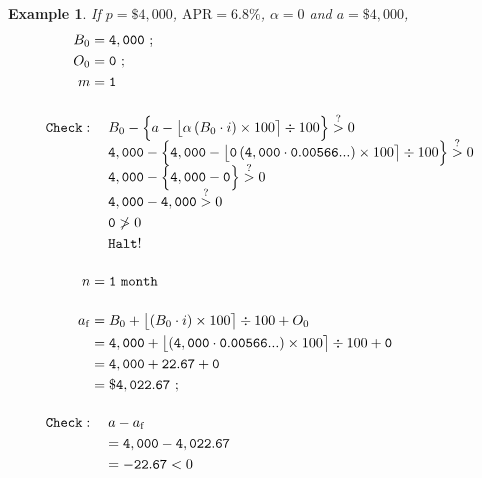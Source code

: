 \documentclass[12pt,letterpaper,oneside]{article}
\newtheorem{example}{Example}[section]
\theoremstyle{remark} %
\begin{document}
	\renewcommand{\rate}{0.00566...}
	\renewcommand{\proportion}{0}
	\renewcommand{\amount}{4,000}
	\renewcommand{\balance}{4,000}
	\renewcommand{\interest}{0}
	\renewcommand{\months}{0}
	\renewcommand{\monthsp}{1}
	\renewcommand{\balanceitf}{\balance}
	\renewcommand{\interestitf}{\interest}
	\renewcommand{\monthsitf}{\months}%
	\renewcommand{\monthspitf}{\monthsp}%
	\renewcommand{\amountfinal}{4,022.67}
	\begin{example}
	If $p=\$4,000$, $\mbox{APR}=6.8\%$, $\alpha=0$ and $a=\$4,000$,
	\footnotesize
	\begin{align*}
	B_{0}&=\mathtt{\balance}\ ;\\
	O_{0}&=\mathtt{\interest}\ ;\\
	m&=\mathtt{\monthsp}\\[12pt]
	\mathtt{Check:}&\quad\;B_{\months}-\Big\{a-\big\lfloor{\alpha\left(B_{\months}\cdot i\right)\times 100}\big\rceil\div 100\Big\}\overset{?}{>}0\\[-6pt]
	&\quad\;\mathtt{\balance}-\Big\{\mathtt{\amount}-\big\lfloor{\mathtt{\proportion}\left(\mathtt{\balance}\cdot \mathtt{\rate}\right)\times 100}\big\rceil\div 100\Big\}\overset{?}{>}0\\[-6pt]
	&\quad\;\mathtt{\balance}-\Big\{\mathtt{\amount}-\mathtt{0}\Big\}\overset{?}{>}0\\[-6pt]
	&\quad\;\mathtt{\balance}-\mathtt{4,000}\overset{?}{>}0\\
	&\quad\;\mathtt{0}\ngtr 0\\
	&\quad\;\mathtt{Halt!}\\[12pt]
	n&=\mathtt{\monthspitf\ month}\\[12pt]
	a_{\rm{f}}&=B_{\monthsitf}+\big\lfloor{\left(B_{\monthsitf}\cdot i\right)\times 100}\big\rceil\div 100+O_{\monthsitf}\\
	&=\mathtt{\balanceitf}+\big\lfloor{\left(\mathtt{\balanceitf}\cdot \mathtt{\rate}\right)\times 100}\big\rceil\div 100+\mathtt{\interestitf}\\
	&=\mathtt{\balanceitf}+\mathtt{22.67}+\mathtt{\interestitf}\\
	&=\mathtt{\$\amountfinal}\ ;\\[12pt]
	\mathtt{Check:}&\quad\;a-a_{\rm{f}}\\
	&\quad =\mathtt{\amount}-\mathtt{\amountfinal}\\
	&\quad =\mathtt{-22.67}<0\\[12pt]

\end{align*}
\end{example}
\end{document}
